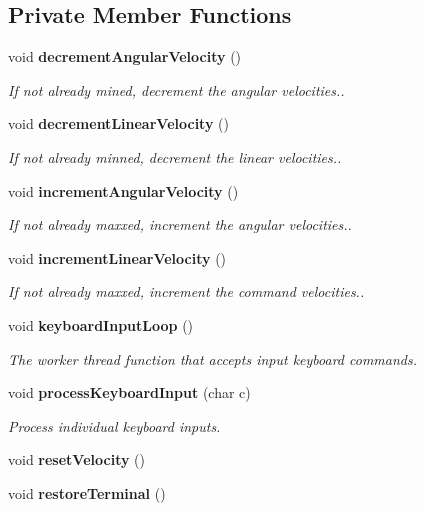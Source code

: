 \subsection*{\-Private \-Member \-Functions}
\begin{DoxyCompactItemize}
\item 
void {\bf decrement\-Angular\-Velocity} ()
\begin{DoxyCompactList}\small\item\em \-If not already mined, decrement the angular velocities.. \end{DoxyCompactList}\item 
void {\bf decrement\-Linear\-Velocity} ()
\begin{DoxyCompactList}\small\item\em \-If not already minned, decrement the linear velocities.. \end{DoxyCompactList}\item 
void {\bf increment\-Angular\-Velocity} ()
\begin{DoxyCompactList}\small\item\em \-If not already maxxed, increment the angular velocities.. \end{DoxyCompactList}\item 
void {\bf increment\-Linear\-Velocity} ()
\begin{DoxyCompactList}\small\item\em \-If not already maxxed, increment the command velocities.. \end{DoxyCompactList}\item 
void {\bf keyboard\-Input\-Loop} ()
\begin{DoxyCompactList}\small\item\em \-The worker thread function that accepts input keyboard commands. \end{DoxyCompactList}\item 
void {\bf process\-Keyboard\-Input} (char c)
\begin{DoxyCompactList}\small\item\em \-Process individual keyboard inputs. \end{DoxyCompactList}\item 
void {\bf reset\-Velocity} ()
\item 
void {\bf restore\-Terminal} ()
\end{DoxyCompactItemize}
